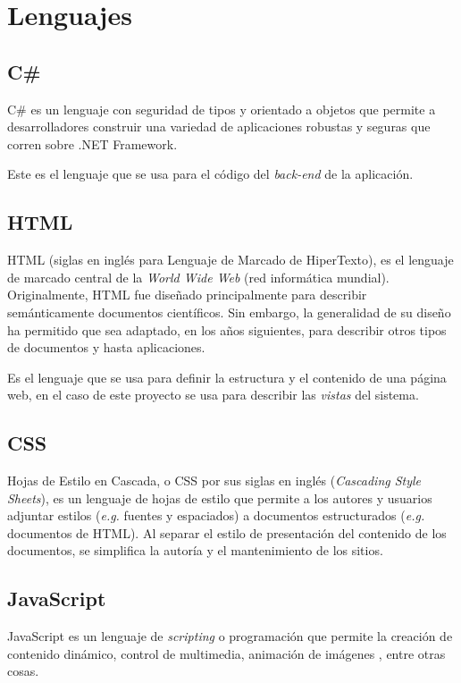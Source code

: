 \section{Lenguajes}
\subsection{C\#}
C\# es un lenguaje con seguridad de tipos y orientado a objetos que permite a desarrolladores construir una variedad de aplicaciones robustas y seguras que corren sobre .NET Framework. \cite{cSharpMicrosoft}

Este es el lenguaje que se usa para el código del \textit{back-end} de la aplicación.

\subsection{HTML}
HTML (siglas en inglés para Lenguaje de Marcado de HiperTexto), es el lenguaje de marcado central de la \textit{World Wide Web} (red informática mundial). Originalmente, HTML fue diseñado principalmente para describir semánticamente documentos científicos. Sin embargo, la generalidad de su diseño ha permitido que sea adaptado, en los años siguientes, para describir otros tipos de documentos y hasta aplicaciones. \cite{htmlW3C}

Es el lenguaje que se usa para definir la estructura y el contenido de una página web, en el caso de este proyecto se usa para describir las \textit{vistas} del sistema.

\subsection{CSS}
Hojas de Estilo en Cascada, o CSS por sus siglas en inglés (\textit{Cascading Style Sheets}), es un lenguaje de hojas de estilo que permite a los autores y usuarios adjuntar estilos (\textit{e.g.} fuentes y espaciados) a documentos estructurados (\textit{e.g.} documentos de HTML). Al separar el estilo de presentación del contenido de los documentos, se simplifica la autoría y el mantenimiento de los sitios. \cite{cssW3C}

\subsection{JavaScript}
JavaScript es un lenguaje de \textit{scripting} o programación que permite la creación de contenido dinámico, control de multimedia, animación de imágenes \cite{jsMozilla}, entre otras cosas.

